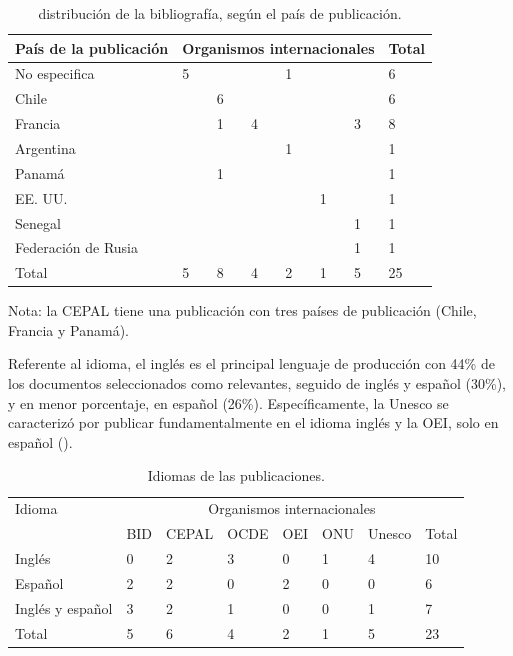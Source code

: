 \begin{table}[htpb]
\centering
\begin{threeparttable}
\caption{distribución de la bibliografía, según el país de publicación.}
\label{tab-08}
\begin{tabular}{*{8}{l}}
\toprule
  País de la publicación & \multicolumn{6}{c}{Organismos internacionales} & Total \\
\midrule
  No especifica & 5 & & & 1 & & & 6 \\
  Chile & & 6 & & & & & 6 \\
  Francia & & 1 & 4 & & & 3 & 8 \\
  Argentina & & & & 1 & & & 1 \\
  Panamá & & 1 & & & & & 1 \\
  EE. UU. & & & & & 1 & & 1 \\
  Senegal & & & & & & 1 & 1 \\
  Federación de Rusia & & & & & & 1 & 1 \\
  Total & 5 & 8 & 4 & 2 & 1 & 5 & 25 \\
 \bottomrule
\end{tabular}
\begin{tablenotes}
\small {
	\item{Nota: la CEPAL tiene una publicación con tres países de publicación (Chile, Francia y Panamá).} 
    }
\end{tablenotes}
\end{threeparttable}
\end{table}

Referente al idioma, el inglés es el principal lenguaje de producción
con 44\% de los documentos seleccionados como relevantes, seguido de
inglés y español (30\%), y en menor porcentaje, en español (26\%).
Específicamente, la Unesco se caracterizó por publicar fundamentalmente
en el idioma inglés y la OEI, solo en español ().


\begin{table}[htpb]
  \centering
  \caption{Idiomas de las publicaciones.}
  \label{tab-09}
  \begin{tabular}{llllllll}
  \toprule
  Idioma & \multicolumn{7}{c}{Organismos internacionales} \\
    & BID & CEPAL & OCDE & OEI & ONU & Unesco & Total \\
  \midrule
  Inglés & 0 & 2 & 3 & 0 & 1 & 4 & 10 \\
  Español & 2 & 2 & 0 & 2 & 0 & 0 & 6 \\
  Inglés y español & 3 & 2 & 1 & 0 & 0 & 1 & 7 \\
  Total & 5 & 6 & 4 & 2 & 1 & 5 & 23 \\
  \bottomrule
  \end{tabular}
\end{table}

